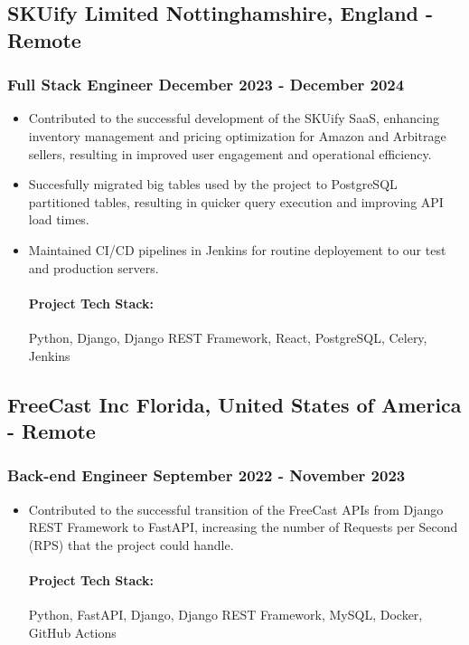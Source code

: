 \documentclass[11pt]{article} %
\begin{document}
\subsection{SKUify Limited \hfill Nottinghamshire, England - Remote}
\subsubsection{Full Stack Engineer \hfill  December 2023 - December 2024}
\begin{itemize}
    \item Contributed to the successful development of the SKUify SaaS, enhancing inventory management and pricing optimization for Amazon and Arbitrage sellers, resulting in improved user engagement and operational efficiency.
    \item Succesfully migrated big tables used by the project to PostgreSQL partitioned tables, resulting in quicker query execution and improving API load times.
    \item Maintained CI/CD pipelines in Jenkins for routine deployement to our test and production servers.

    \paragraph{Project Tech Stack:} Python, Django, Django REST Framework, React, PostgreSQL, Celery, Jenkins
\end{itemize}

\subsection{FreeCast Inc \hfill Florida, United States of America - Remote}
\subsubsection{Back-end Engineer \hfill  September 2022 - November 2023}
\begin{itemize}
    \item Contributed to the successful transition of the FreeCast APIs from Django REST Framework to FastAPI, increasing the number of Requests per Second (RPS) that the project could handle.

    \paragraph{Project Tech Stack:} Python, FastAPI, Django, Django REST Framework, MySQL, Docker, GitHub Actions
\end{itemize}
\end{document}
